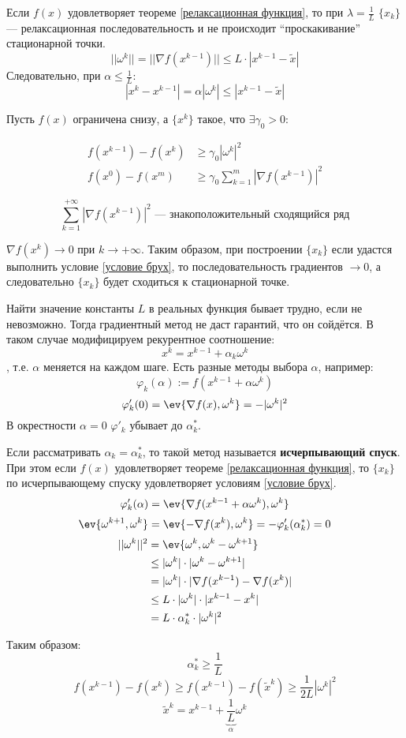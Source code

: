 Если \(f(x)\) удовлетворяет теореме \ref{релаксационная функция}, то при \(\lambda = \frac{1}{L}\) \(\{x_k\}\) --- релаксационная последовательность и не происходит ``проскакивание'' стационарной точки.
\[||\omega^k|| = ||\nabla f(x^{k - 1})|| \leq L \cdot |x^{k - 1} - \tilde{x}|\]
Следовательно, при \(\alpha \leq \frac{1}{L}\):
\[|x^k - x^{k - 1}| = \alpha |\omega^k| \leq |x^{k - 1} - \tilde{x}|\]

Пусть \(f(x)\) ограничена снизу, а \(\{x^k\}\) такое, что \(\exists \gamma_0 > 0\):

\begin{align}
    f(x^{k - 1}) - f(x^k) & \geq \gamma_0 |\omega^k| ^2 \label{условие брух}     \\
    f(x^0) - f(x^m)       & \geq \gamma_0 \sum_{k = 1}^m |\nabla f(x^{k - 1})|^2
\end{align}

\[\sum_{k = 1}^{+\infty} |\nabla f(x^{k - 1})|^2 \text{ --- знакоположительный сходящийся ряд}\]

\(\nabla f(x^k) \to 0\) при \(k \to +\infty\). Таким образом, при построении \(\{x_k\}\) если удастся выполнить условие \eqref{условие брух}, то последовательность градиентов \( \to 0\), а следовательно \(\{x_k\}\) будет сходиться к стационарной точке.

Найти значение константы \(L\) в реальных функция бывает трудно, если не невозможно. Тогда градиентный метод не даст гарантий, что он сойдётся. В таком случае модифицируем рекурентное соотношение:
\begin{equation}
    x^k = x^{k - 1} + \alpha_k \omega^k
    \label{измененная рекурента}
\end{equation}
, т.е. \(\alpha\) меняется на каждом шаге. Есть разные методы выбора \(\alpha\), например:
\[\varphi_k(\alpha) := f(x^{k - 1} + \alpha \omega^k)\]
\[\varphi_k'(0) = \ev{\nabla f(x), \omega^k} = - |\omega^k|^2\]
В окрестности \(\alpha = 0\) \(\varphi'_k\) убывает до \(\alpha_k^*\).

Если рассматривать \(\alpha_k = \alpha_k^*\), то такой метод называется \textbf{исчерпывающий спуск}. При этом если \(f(x)\) удовлетворяет теореме \ref{релаксационная функция}, то \(\{x_k\}\) по исчерпывающему спуску удовлетворяет условиям \eqref{условие брух}.
\[\varphi_k'(\alpha) = \ev{\nabla f(x^{k - 1} + \alpha \omega^k), \omega^k}\]
\[\ev{\omega^{k + 1}, \omega^k} = \ev{ -\nabla f(x^k), \omega^k} = - \varphi_k' (\alpha^*_k) = 0\]
\begin{align*}
    ||\omega^k||^2 & = \ev{\omega^k, \omega^k - \omega^{k + 1}}               \\
                   & \leq |\omega^k| \cdot |\omega^k - \omega^{k + 1}|        \\
                   & = |\omega^k| \cdot |\nabla f(x^{k - 1}) - \nabla f(x^k)| \\
                   & \leq L \cdot |\omega^k| \cdot |x^{k - 1} - x^k|          \\
                   & = L \cdot \alpha_k^* \cdot |\omega^k|^2
\end{align*}

Таким образом:
\[\alpha_k^* \geq \frac{1}{L}\]
\[f(x^{k - 1}) - f(x^k) \geq f(x^{k - 1}) - f(\tilde{x}^k) \geq \frac{1}{2L} |\omega^k|^2\]
\[\tilde{x}^k = x^{k - 1} + \underbrace{\frac{1}{L}}_\alpha \omega^k\]

